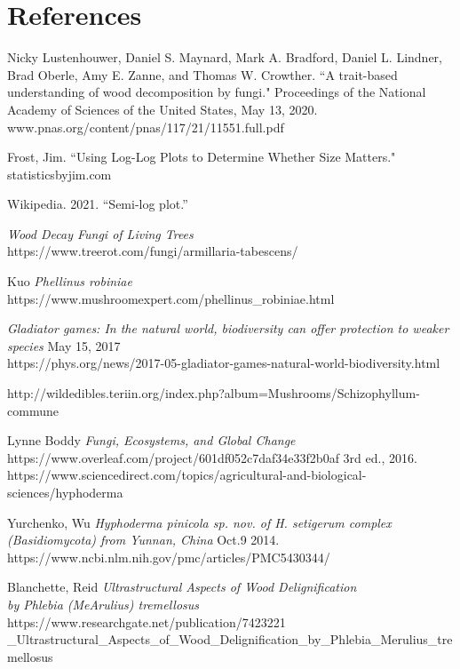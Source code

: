 \documentclass[12pt]{article}
\begin{document}
\newpage

\section{References}
\renewcommand\refname{}

\begin{thebibliography}{9}

Nicky Lustenhouwer, Daniel S. Maynard, Mark A. Bradford, Daniel L. Lindner, Brad Oberle, Amy E. Zanne, and Thomas W. Crowther.
``A trait-based understanding of wood decomposition by fungi." Proceedings of the National Academy of Sciences of the United States, May 13, 2020. www.pnas.org/content/pnas/117/21/11551.full.pdf

Frost, Jim. 
``Using Log-Log Plots to Determine Whether Size Matters."  statisticsbyjim.com 

Wikipedia. 2021. ``Semi-log plot.'' 

\emph{Wood Decay Fungi of Living Trees}\\
https://www.treerot.com/fungi/armillaria-tabescens/

Kuo
\emph{Phellinus robiniae}\\
https://www.mushroomexpert.com/phellinus\_robiniae.html


\emph{Gladiator games: In the natural world, biodiversity can offer protection to weaker species}
May 15, 2017\\
https://phys.org/news/2017-05-gladiator-games-natural-world-biodiversity.html

http://wildedibles.teriin.org/index.php?album=Mushrooms/Schizophyllum-commune

Lynne Boddy
\emph{Fungi, Ecosystems, and Global Change}\\https://www.overleaf.com/project/601df052c7daf34e33f2b0af
3rd ed., 2016.
https://www.sciencedirect.com/topics/agricultural-and-biological-sciences/hyphoderma

Yurchenko, Wu
\emph{Hyphoderma pinicola sp. nov. of H. setigerum complex (Basidiomycota) from Yunnan, China}
Oct.9 2014.
https://www.ncbi.nlm.nih.gov/pmc/articles/PMC5430344/

Blanchette, Reid
\emph{Ultrastructural Aspects of Wood Delignification \\by Phlebia (MeArulius) tremellosus}\\
https://www.researchgate.net/publication/7423221
\_Ultrastructural\_Aspects\_of\_Wood\_Delignification\_by\_Phlebia\_Merulius\_tremellosus


\end{thebibliography}
\end{document}
